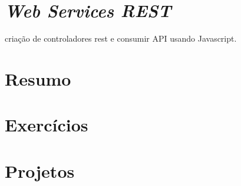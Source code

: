 

\section{\textit{Web Services REST}}

criação de controladores rest e consumir API usando Javascript.


\section{Resumo}

\section{Exercícios}

\section{Projetos}

